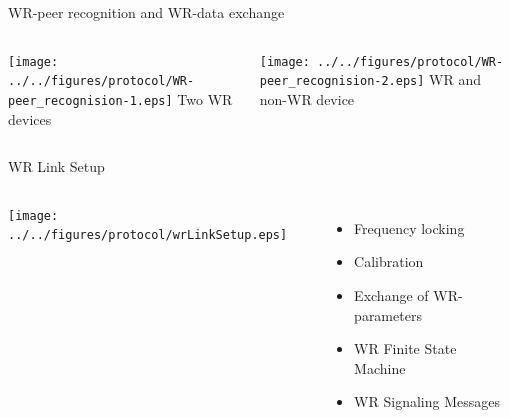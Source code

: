 \documentclass[compress,red]{beamer}
\begin{document}
\begin{frame}{WR-peer recognition and WR-data exchange}

  \begin{columns}[c]

    \begin{center}
    \texttt{[image: ../../figures/protocol/WR-peer\_recognision-1.eps]}
    \newline
    Two WR devices
    \end{center}
    

    \begin{center}
    \texttt{[image: ../../figures/protocol/WR-peer\_recognision-2.eps]}
    \newline
    WR and non-WR device
    \end{center}
     
  \end{columns}

\end{frame}
\begin{frame}{WR Link Setup }

  \begin{columns}[c]

      \begin{center}
      \texttt{[image: ../../figures/protocol/wrLinkSetup.eps]}
      \end{center}



      \begin{itemize}
	\item Frequency locking
	\item Calibration
	\item Exchange of WR-parameters
	\item WR Finite State Machine
	\item WR Signaling Messages
      \end{itemize}

  \end{columns}

\end{frame}
\end{document}
